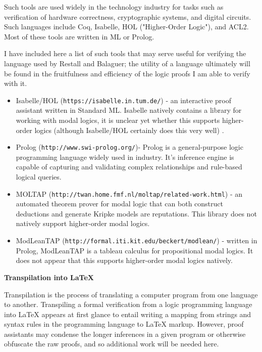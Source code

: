 \documentclass[12pt]{article}
\theoremstyle{definition}
\begin{document}
Such tools are used widely in the technology industry for tasks such as
verification of hardware correctness, cryptographic systems, and digital
circuits. Such languages include Coq, Isabelle, HOL ("Higher-Order Logic"), and
ACL2. Most of these tools are written in ML or Prolog. 

I have included here a list of such tools that may serve useful for verifying
the language used by Restall and Balaguer; the utility of a language ultimately
will be found in the fruitfulness and efficiency of the logic proofs I am able
to verify with it.

\begin{itemize}
    \item Isabelle/HOL (\texttt{https://isabelle.in.tum.de/}) - an interactive
        proof assistant written in Standard ML. Isabelle natively contains a
        library for working with modal logics, it is unclear yet whether this
        supports higher-order logics (although Isabelle/HOL certainly does this
        very well) \cite{modalisabelle}.
    \item Prolog (\texttt{http://www.swi-prolog.org/})- Prolog is a
        general-purpose logic programming language widely used in industry.
        It's inference engine is capable of capturing and validating complex
        relationships and rule-based logical queries.
    \item MOLTAP (\texttt{http://twan.home.fmf.nl/moltap/related-work.html}) -
        an automated theorem prover for modal logic that can both construct
        deductions and generate Kripke models are reputations. This library
        does not natively support higher-order modal logics.
    \item ModLeanTAP  (\texttt{http://formal.iti.kit.edu/beckert/modlean/}) -
        written in Prolog, ModLeanTAP is a tableau calculus for propositional
        modal logics. It does not appear that this supports higher-order modal
        logics natively.

\end{itemize}

\textbf{Transpilation into LaTeX}

Transpilation is the process of translating a computer program from one
language to another. Transpiling a formal verification from a logic programming
language into LaTeX appears at first glance to entail writing a mapping from
strings and syntax rules in the programming language to LaTeX markup. However,
proof assistants may condense the longer inferences in a given program or
otherwise obfuscate the raw proofs, and so additional work will be needed here.
\end{document}
